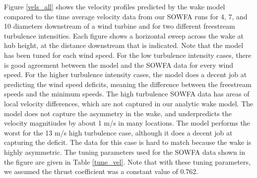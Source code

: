 \documentclass[11pt,letterpaper]{article}
\begin{document}
Figure \ref{vels_all} shows the velocity profiles predicted by the wake model compared to the time average velocity data from our SOWFA runs for 4, 7, and 10 diameters downstream of a wind turbine and for two different freestream turbulence intensities. Each figure shows a horizontal sweep across the wake at hub height, at the distance downstream that is indicated. Note that the model has been tuned for each wind speed. For the low turbulence intensity cases, there is good agreement between the model and the SOWFA data for every wind speed. 
For the higher turbulence intensity cases, the model does a decent job at predicting the wind speed deficits, meaning the difference between the freestream speeds and the minimum speeds. The high turbulence SOWFA data has areas of local velocity differences, which are not captured in our analytic wake model. The model does not capture the asymmetry in the wake, and underpredicts the velocity magnitiudes by about 1 m/s in many locations. The model performs the worst for the 13 m/s high turbulence case, although it does a decent job at capturing the deficit. The data for this case is hard to match because the wake is highly asymmetric. The tuning parameters used for the SOWFA data shown in the figure are given in Table \ref{tune_vel}. Note that with these tuning parameters, we assumed the thrust coefficient was a constant value of 0.762. 
\end{document}
